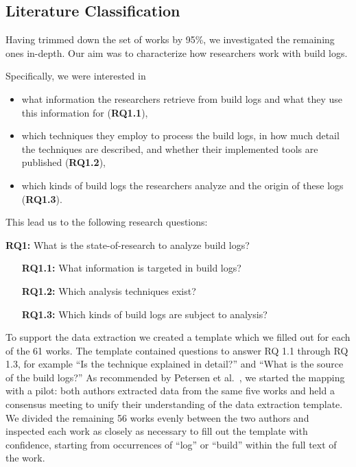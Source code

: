 \subsection{Literature Classification}
Having trimmed down the set of works by 95\%, we investigated the
remaining ones in-depth.
Our aim was to characterize how researchers work with build logs.

Specifically, we were interested in
\begin{itemize}
  \item what information the researchers retrieve from build logs and
  what they use this information for (\textbf{RQ1.1}),
  \item which techniques they employ to process the build logs,
  in how much detail the techniques are described,
	and whether their implemented tools are published
  (\textbf{RQ1.2}),
  \item which kinds of build logs the researchers analyze
	and the origin of these logs (\textbf{RQ1.3}).
\end{itemize}

This lead us to the following research questions:
\begin{simplebox}[attach boxed title to top center={yshift=-6mm}]
{\textbf{RQ1:} What is the state-of-research to analyze build logs?}
\begin{itemize}[leftmargin=1cm]
  \item[\textbf{RQ1.1:}] What information is targeted in build logs?
  \item[\textbf{RQ1.2:}] Which analysis techniques exist?
  \item[\textbf{RQ1.3:}] Which kinds of build logs are subject to
  analysis?
\end{itemize}
\end{simplebox}

To support the data extraction we created a template which we filled out
for each of the 61 works.
The template contained questions to answer RQ 1.1 through RQ 1.3,
for example ``Is the technique explained in detail?'' and
``What is the source of the build logs?''
As recommended by Petersen et
al.~\citep{petersen2015guidelines}, we started the mapping with a
pilot:
both authors extracted data from the same five works and held a
consensus meeting to unify their understanding
of the data extraction template.
We divided the remaining 56 works evenly between the two authors
and inspected each work as closely as necessary to fill out the
template
with confidence,
starting from occurrences of ``log'' or ``build'' within the full
text of the work.

